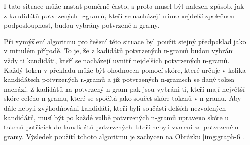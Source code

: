 I tato situace může nastat poměrně často,
  a proto musel být nalezen způsob,
  jak z kandidátů potvrzených \mbox{n-gramů},
  kteří se nacházejí mimo nejdelší společnou podposloupnost,
  budou vybrány potvrzené \mbox{n-gramy}. 


Při vymýšlení algoritmu pro řešení této situace byl použit stejný předpoklad jako v minulém případě.
To je, že z kadidátů potvrzených \mbox{n-gramů} budou vybráni vždy ti kandidáti,
  kteří se nacházejí uvnitř nejdelších potvrzených \mbox{n-gramů}.
Každý token v překladu může být ohodnocen pomocí skóre,
  které určuje v kolika kandidátech potvrzených \mbox{n-gramů} a již potvrzených \mbox{n-gramech} se daný token nachází.
Z kadidátů na potvrzený \mbox{n-gram} pak jsou vybráni ti,
  kteří mají největší skóre celého \mbox{n-gramu},
  které se spočítá jako součet skóre tokenů v \mbox{n-gramu}.
Aby dále nebyli zvýhodňováni kandidáti,
  kteří byli součástí delších nezvolených kandidátů,
  musí být po každé volbě potvrzených \mbox{n-gramů} upraveno skóre u tokenů patřících do kandidátů potvrzených,
  kteří nebyli zvoleni za potvrzené \mbox{n-gramy}.
Výsledek použítí tohoto algoritmu je zachycen na Obrázku \ref{img:graph-6}.


